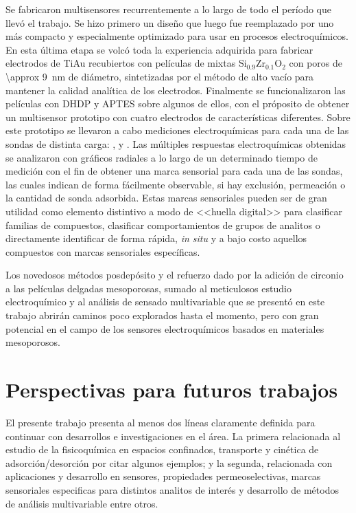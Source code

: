  Se fabricaron multisensores recurrentemente a lo largo de todo el período que llevó el trabajo. Se hizo primero un diseño que luego fue reemplazado por uno más compacto y especialmente optimizado para usar en procesos electroquímicos. En esta última etapa se volcó toda la experiencia adquirida para fabricar electrodos de Ti\textbar Au recubiertos con películas de mixtas Si$_{0.9}$Zr$_{0.1}$O$_2$ con poros de \SI{\approx 9}{\nm} de diámetro, sintetizadas por el método de alto vacío para mantener la calidad analítica de los electrodos. Finalmente se funcionalizaron las películas con DHDP y APTES sobre algunos de ellos, con el próposito de obtener un multisensor prototipo con cuatro electrodos de características diferentes. Sobre este prototipo se llevaron a cabo mediciones electroquímicas para cada una de las sondas de distinta carga: \ferroferri, \ferroceno\space y \aminorutenio. Las múltiples respuestas electroquímicas obtenidas se analizaron con gráficos radiales a lo largo de un determinado tiempo de medición con el fin de obtener una marca sensorial para cada una de las sondas, las cuales indican de forma fácilmente observable, si hay exclusión, permeación o la cantidad de sonda adsorbida. Estas marcas sensoriales pueden ser de gran utilidad como elemento distintivo a modo de <<huella digital>> para clasificar familias de compuestos, clasificar comportamientos de grupos de analitos o directamente identificar de forma rápida, \textit{in situ} y a bajo costo aquellos compuestos con marcas sensoriales específicas.

 Los novedosos métodos posdepósito y el refuerzo dado por la adición de circonio a las películas delgadas mesoporosas, sumado al meticulosos estudio electroquímico y al análisis de sensado multivariable que se presentó en este trabajo abrirán caminos poco explorados hasta el momento, pero con gran potencial en el campo de los sensores electroquímicos basados en materiales mesoporosos.

\section{Perspectivas para futuros trabajos}
 
 		El presente trabajo presenta al menos dos líneas claramente definida para continuar con desarrollos e investigaciones en el área. La primera relacionada al estudio de la fisicoquímica en espacios confinados, transporte y cinética de adsorción/desorción por citar algunos ejemplos; y la segunda, relacionada con aplicaciones y desarrollo en sensores, propiedades permeoselectivas, marcas sensoriales especificas para distintos analitos de interés y desarrollo de métodos de análisis multivariable entre otros.
 
